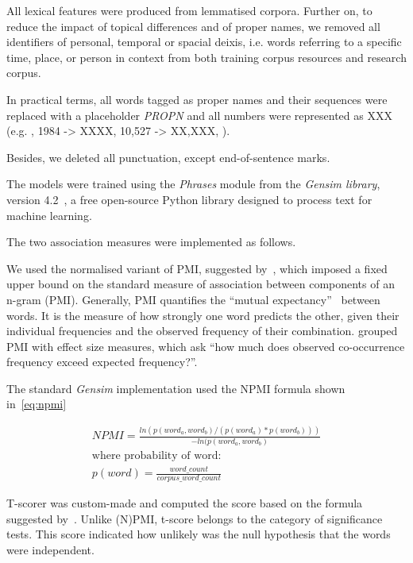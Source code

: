 All lexical features were produced from lemmatised corpora. 
Further on, to reduce the impact of topical differences and of proper names, we removed all identifiers of personal, temporal or spacial deixis, i.e. words referring to a specific time, place, or person in context from both training corpus resources and research corpus.

In practical terms, all words tagged as proper names and their sequences were replaced with a placeholder \textit{PROPN} and all numbers were represented as XXX (e.g. , 1984 -> XXXX, 10,527 -> XX,XXX, ). 

Besides, we deleted all punctuation, except end-of-sentence marks.

The models were trained using the \textit{Phrases} module from the \textit{Gensim library}, version 4.2~\cite{Rehurek2010}, a free open-source Python library designed to process text for machine learning.

The two association measures were implemented as follows. 

We used the normalised variant of \gls{PMI}, suggested by~\citet{Bouma2009}, which imposed a fixed upper bound on the standard measure of association between components of an n-gram (\gls{PMI}). Generally, PMI quantifies the ``mutual expectancy''~\cite[(Firth 1957, 181) as quoted in][]{Evert2009} between words. It is the measure of how strongly one word predicts the other, given their individual frequencies and the observed frequency of their combination. \cite{Evert2009} grouped PMI with effect size measures, which ask ``how much does observed co-occurrence frequency exceed expected frequency?''.

The standard \textit{Gensim} implementation used the NPMI formula shown in~\ref{eq:npmi}

\begin{equation}\label{eq:npmi}
\begin{split}
NPMI = \frac{ln(p(word_a, word_b) / (p(word_a)*p(word_b)))}{ -ln(p(word_a, word_b)} \\
\text{where probability of word:}\\
p(word) = \frac{word\_count}{corpus\_word\_count}
\end{split}
\end{equation}

T-scorer was custom-made and computed the score based on the formula suggested by~\citet{Gries2010}. Unlike (N)PMI, t-score belongs to the category of significance tests. This score indicated  how unlikely was the null hypothesis that the words were independent.

